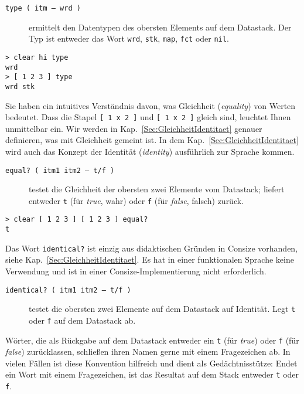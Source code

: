 \begin{description}
\item[\texttt{type ( itm -- wrd )}] ermittelt den Datentypen des obersten Elements auf dem Datastack. Der Typ ist entweder das Wort \verb|wrd|, \verb|stk|, \verb|map|, \verb|fct| oder \verb|nil|.
\end{description}

\begin{verbatim}
> clear hi type
wrd
> [ 1 2 3 ] type
wrd stk
\end{verbatim}

Sie haben ein intuitives Verständnis davon, was Gleichheit (\emph{equality}) von Werten bedeutet. Dass die Stapel \verb|[ 1 x 2 ]| und \verb|[ 1 x 2 ]| gleich sind, leuchtet Ihnen unmittelbar ein. Wir werden in Kap.~\ref{Sec:GleichheitIdentitaet} genauer definieren, was mit Gleichheit gemeint ist. In dem Kap.~\ref{Sec:GleichheitIdentitaet} wird auch das Konzept der Identität (\emph{identity}) ausführlich zur Sprache kommen. 

\begin{description}
\item[\texttt{equal? ( itm1 itm2 -- t/f )}] testet die Gleichheit der obersten zwei Elemente vom Datastack; liefert entweder \verb|t| (für \emph{true}, wahr) oder \verb|f| (für \emph{false}, falsch) zurück.
\end{description}

\begin{verbatim}
> clear [ 1 2 3 ] [ 1 2 3 ] equal?
t
\end{verbatim}

Das Wort \verb|identical?| ist einzig aus didaktischen Gründen in Consize vorhanden, siehe Kap.~\ref{Sec:GleichheitIdentitaet}. Es hat in einer funktionalen Sprache keine Verwendung und ist in einer Consize-Implementierung nicht erforderlich.

\begin{description}
\item[\texttt{identical? ( itm1 itm2 -- t/f )}] testet die obersten zwei Elemente auf dem Datastack auf Identität. Legt \verb|t| oder \verb|f| auf dem Datastack ab.
\end{description}

Wörter, die als Rückgabe auf dem Datastack entweder ein \verb|t| (für \emph{true}) oder \verb|f| (für \emph{false}) zurücklassen, schließen ihren Namen gerne mit einem Fragezeichen ab. In vielen Fällen ist diese Konvention hilfreich und dient als Gedächtnisstütze: Endet ein Wort mit einem Fragezeichen, ist das Resultat auf dem Stack entweder \verb|t| oder \verb|f|.

